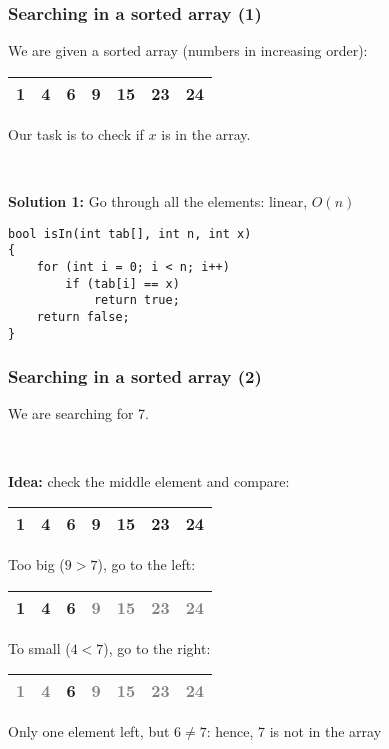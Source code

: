 \documentclass[12pt]{beamer}
\newcommand{\gray}{\textcolor{gray}}
\begin{document}
\begin{frame}[fragile]
\frametitle{Searching in a sorted array (1)}
We are given a sorted array (numbers in increasing order):
\begin{center}
\def\arraystretch{1.3}
\begin{tabu} to .7\textwidth {|X[c]|X[c]|X[c]|X[c]|X[c]|X[c]|X[c]|}
 & 4 & 6 & 9 & 15 & 23 & 24 \\
\hline
\end{tabu}
\end{center}
Our task is to check if $x$ is in the array.

~

\textbf{Solution 1:} Go through all the elements: linear, $O(n)$
\begin{lstlisting}
bool isIn(int tab[], int n, int x)
{
    for (int i = 0; i < n; i++)
        if (tab[i] == x)
            return true;
    return false;
}
\end{lstlisting}
\end{frame}

\begin{frame}
\frametitle{Searching in a sorted array (2)}
We are searching for 7.

~

\textbf{Idea:} check the middle element and compare:
\begin{center}
\def\arraystretch{1.3}
\begin{tabu} to .7\textwidth {|X[c]|X[c]|X[c]|X[c]|X[c]|X[c]|X[c]|}
 & 4 & 6 & \textbf{9} & 15 & 23 & 24 \\
\hline
\end{tabu}
\end{center}
Too big ($9>7$), go to the left:
\begin{center}
\def\arraystretch{1.3}
\begin{tabu} to .7\textwidth {|X[c]|X[c]|X[c]|X[c]|X[c]|X[c]|X[c]|}
 & \textbf{4} & 6 & \gray{9} & \gray{15} & \gray{23} & \gray{24} \\
\hline
\end{tabu}
\end{center}
To small ($4<7$), go to the right:
\begin{center}
\def\arraystretch{1.3}
\begin{tabu} to .7\textwidth {|X[c]|X[c]|X[c]|X[c]|X[c]|X[c]|X[c]|}
\hline
\gray{1} & \gray{4} & \textbf{6} & \gray{9} & \gray{15} & \gray{23} & \gray{24} \\
\hline
\end{tabu}
\end{center}
Only one element left, but $6\neq7$: hence, 7 is not in the array
\end{frame}
\end{document}
